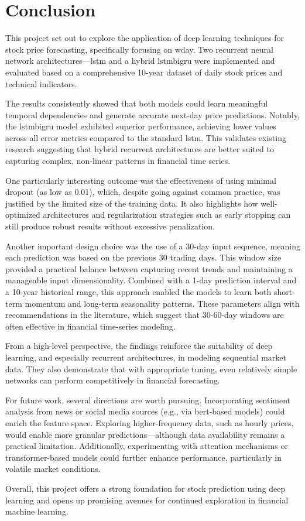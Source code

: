 \clearpage
\section{Conclusion}

This project set out to explore the application of deep learning techniques for
stock price forecasting, specifically focusing on \acrfull{wday}. Two recurrent 
neural network architectures—\acrshort{lstm} and a hybrid \acrshort{lstmbigru}
were implemented and evaluated based on a comprehensive 10-year dataset of daily
stock prices and technical indicators.

The results consistently showed that both models could learn meaningful temporal
dependencies and generate accurate next-day price predictions. Notably, the 
\acrshort{lstmbigru} model exhibited superior performance, achieving lower values 
across all error metrics compared to the standard \acrshort{lstm}. This validates 
existing research suggesting that hybrid recurrent architectures are better suited to 
capturing complex, non-linear patterns in financial time series.

One particularly interesting outcome was the effectiveness of using minimal dropout 
(as low as 0.01), which, despite going against common practice, was justified by the
limited size of the training data. It also highlights how well-optimized 
architectures and regularization strategies such as early stopping can still 
produce robust results without excessive penalization.

Another important design choice was the use of a 30-day input sequence, meaning each
prediction was based on the previous 30 trading days. This window size provided a 
practical balance between capturing recent trends and maintaining a manageable input
dimensionality. Combined with a 1-day prediction interval and a 10-year historical 
range, this approach enabled the models to learn both short-term momentum and 
long-term seasonality patterns. These parameters align with recommendations in the 
literature, which suggest that 30-60-day windows are often effective in financial 
time-series modeling.

From a high-level perspective, the findings reinforce the suitability of deep
learning, and especially recurrent architectures, in modeling sequential market data. 
They also demonstrate that with appropriate tuning, even relatively simple networks 
can perform competitively in financial forecasting.

For future work, several directions are worth pursuing. Incorporating sentiment 
analysis from news or social media sources (e.g., via \acrshort{bert}-based models) 
could enrich the feature space. Exploring higher-frequency data, such as hourly 
prices, would enable more granular predictions—although data availability remains a 
practical limitation. Additionally, experimenting with attention mechanisms or 
transformer-based models could further enhance performance, particularly in volatile 
market conditions.

Overall, this project offers a strong foundation for stock prediction using deep 
learning and opens up promising avenues for continued exploration in financial
machine learning.
